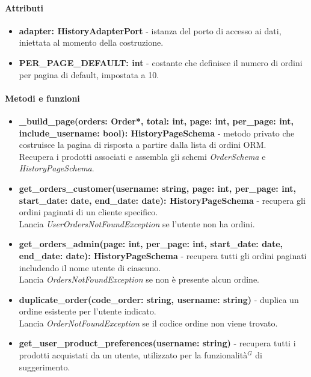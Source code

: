 \paragraph{Attributi}
\begin{itemize}
	\item \textbf{adapter: HistoryAdapterPort} - istanza del porto di accesso ai dati, iniettata al momento della costruzione.
	\item \textbf{PER\_PAGE\_DEFAULT: int} - costante che definisce il numero di ordini per pagina di default, impostata a 10.
\end{itemize}

\paragraph{Metodi e funzioni}
\begin{itemize}
	\item \textbf{\_build\_page(orders: Order*, total: int, page: int, per\_page: int, include\_username: bool): HistoryPageSchema} - metodo privato che costruisce la pagina di risposta a partire dalla lista di ordini ORM.\\
	Recupera i prodotti associati e assembla gli schemi \textit{OrderSchema} e \textit{HistoryPageSchema}.
	\item \textbf{get\_orders\_customer(username: string, page: int, per\_page: int, start\_date: date, end\_date: date): HistoryPageSchema} - recupera gli ordini paginati di un cliente specifico.\\
	Lancia \textit{UserOrdersNotFoundException} se l'utente non ha ordini.
	\item \textbf{get\_orders\_admin(page: int, per\_page: int, start\_date: date, end\_date: date): HistoryPageSchema} - recupera tutti gli ordini paginati includendo il nome utente di ciascuno.\\
	Lancia \textit{OrdersNotFoundException} se non è presente alcun ordine.
	\item \textbf{duplicate\_order(code\_order: string, username: string)} - duplica un ordine esistente per l'utente indicato.\\
	Lancia \textit{OrderNotFoundException} se il codice ordine non viene trovato.
	\item \textbf{get\_user\_product\_preferences(username: string)} - recupera tutti i prodotti acquistati da un utente, utilizzato per la funzionalità$^G$ di suggerimento.
\end{itemize}

